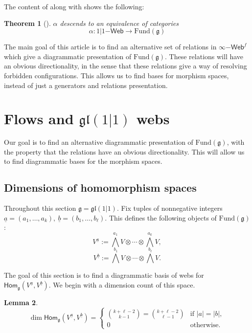 \documentclass[11pt,a4paper,reqno]{amsart}
\newcommand{\g}{\mathfrak{g}}
\newcommand{\gl}{\mathfrak{gl}}
\numberwithin{equation}{section}
\renewcommand{\hom}{\mathsf{Hom}}
\newtheorem{thm}{Theorem}[section]
\newtheorem{lemma}[thm]{Lemma}
\theoremstyle{definition}
\theoremstyle{remark}
\begin{document}
The content of \cite[Theorem 5.11]{tubbenhauer-vaz-wedrich} along with \cite[Example 5.3]{tubbenhauer-vaz-wedrich} shows the following:

\begin{thm}[\cite{tubbenhauer-vaz-wedrich}]\label{thm:tvw}
    $\alpha$ descends to an equivalence of categories
    \[\alpha: {1|1}\mathsf{-Web}\to \mathrm{Fund}(\g)\]
\end{thm}

The main goal of this article is to find an alternative set of relations in $\infty\mathsf{-Web}^f$ which give a diagrammatic presentation of $\mathrm{Fund}(\g)$. These relations will have an obvious directionality, in the sense that these relations give a way of resolving forbidden configurations. This allows us to find bases for morphism spaces, instead of just a generators and relations presentation.

\section{Flows and \texorpdfstring{$\gl(1|1)$}{gl(1|1)} webs}
\label{sec:flows}

Our goal is to find an alternative diagrammatic presentation of $\mathrm{Fund}(\g)$, with the property that the relations have an obvious directionality. This will allow us to find diagrammatic bases for the morphism spaces. 

\subsection{Dimensions of homomorphism spaces}
Throughout this section $\g = \mathfrak{gl}(1|1)$. Fix tuples of nonnegative integers $\underline a = (a_1,\dots, a_k),\ \underline b= (b_1,\dots ,b_\ell)$. This defines the following objects of $\mathrm{Fund}(\g)$:
\[V^{\underline a} := \bigwedge^{a_1}V\otimes \cdots \otimes \bigwedge^{a_k}V,\]
\[V^{\underline b} := \bigwedge^{b_1}V\otimes \cdots \otimes \bigwedge^{b_\ell}V.\]

The goal of this section is to find a diagrammatic basis of webs for $\hom_{\g}\left(V^{\underline a}, V^{\underline b}\right)$. We begin with a dimension count of this space.

\begin{lemma}
\label{lem:dim}
    \[\dim\hom_{\g}(V^{\underline a}, V^{\underline b}) = \begin{cases}
    \binom{k+\ell-2}{k-1} = \binom{k+\ell-2}{\ell-1} &\text{if } |a| = |b|, \\
    0 &\text{otherwise.}
    \end{cases}\]
\end{lemma}
\end{document}

